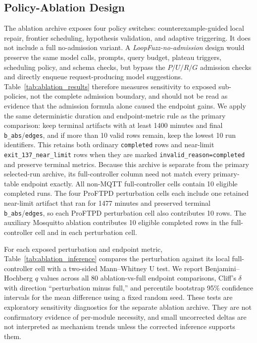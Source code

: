\documentclass[final,5p,times,number]{elsarticle}
\begin{document}
\subsection{Policy-Ablation Design}
The ablation archive exposes four policy switches: counterexample-guided local repair, frontier scheduling, hypothesis validation, and adaptive triggering. It does not include a full no-admission variant. A \emph{LoopFuzz-no-admission} design would preserve the same model calls, prompts, query budget, plateau triggers, scheduling policy, and schema checks, but bypass the $P/U/R/G$ admission checks and directly enqueue request-producing model suggestions. Table~\ref{tab:ablation_results} therefore measures sensitivity to exposed sub-policies, not the complete admission boundary, and should not be read as evidence that the admission formula alone caused the endpoint gains. We apply the same deterministic duration and endpoint-metric rule as the primary comparison: keep terminal artifacts with at least 1400 minutes and final \texttt{b\_abs}/\texttt{edges}, and if more than 10 valid rows remain, keep the lowest 10 run identifiers. This retains both ordinary \texttt{completed} rows and near-limit \texttt{exit\_137\_near\_limit} rows when they are marked \texttt{invalid\_reason=completed} and preserve terminal metrics. Because this archive is separate from the primary selected-run archive, its full-controller column need not match every primary-table endpoint exactly. All non-MQTT full-controller cells contain 10 eligible completed runs. The four ProFTPD perturbation cells each include one retained near-limit artifact that ran for 1477 minutes and preserved terminal \texttt{b\_abs}/\texttt{edges}, so each ProFTPD perturbation cell also contributes 10 rows. The auxiliary Mosquitto ablation contributes 10 eligible completed rows in the full-controller cell and in each perturbation cell.

For each exposed perturbation and endpoint metric, Table~\ref{tab:ablation_inference} compares the perturbation against its local full-controller cell with a two-sided Mann--Whitney U test. We report Benjamini--Hochberg $q$ values across all 80 ablation-vs-full endpoint comparisons, Cliff's $\delta$ with direction ``perturbation minus full,'' and percentile bootstrap 95\% confidence intervals for the mean difference using a fixed random seed. These tests are exploratory sensitivity diagnostics for the separate ablation archive. They are not confirmatory evidence of per-module necessity, and small uncorrected deltas are not interpreted as mechanism trends unless the corrected inference supports them.
\end{document}
